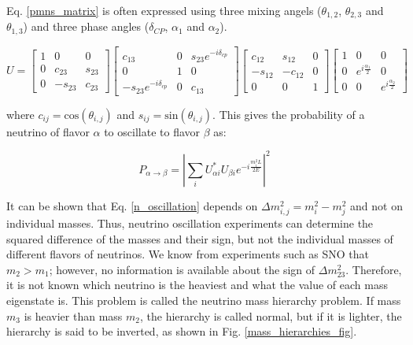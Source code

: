 Eq. \ref{pmns_matrix} is often expressed using three mixing angels ($\theta_{1,2}$, $\theta_{2,3}$ and $\theta_{1,3}$) and three phase angles ($\delta_{CP}$, $\alpha_1$ and $\alpha_2$).

\begin{equation}\label{pmns_matrix_expanded}
U = \begin{bmatrix} 1 & 0 & 0\\ 0 & c_{23} & s_{23} \\ 0 & -s_{23} & c_{23} \end{bmatrix} \begin{bmatrix} c_{13} & 0 & s_{23}e^{-i\delta_{cp}}\\ 0 & 1 & 0 \\ -s_{23}e^{-i\delta_{cp}} & 0 & c_{13} \end{bmatrix} \begin{bmatrix} c_{12} & s_{12} & 0\\ -s_{12} & -c_{12} & 0 \\ 0 & 0 & 1 \end{bmatrix} \begin{bmatrix} 1 & 0 & 0\\ 0 & e^{i\frac{\alpha_1}{2}} & 0 \\ 0 & 0 & e^{i\frac{\alpha_2}{2}}\end{bmatrix}
\end{equation}

where $c_{ij}=\mathrm{cos}(\theta_{i,j})$ and $s_{ij}=\mathrm{sin}(\theta_{i,j})$. This gives the probability of a neutrino of flavor $\alpha$ to oscillate to flavor $\beta$ as:

\begin{equation}\label{n_oscillation}
P_{\alpha\rightarrow\beta} = \left|\sum_i U^*_{\alpha i}U_{\beta i} e^{-i\frac{m_i^2L}{2E}}\right|^2
\end{equation}

It can be shown that Eq. \ref{n_oscillation} depends on $\Delta m^2_{i,j}=m^2_i-m^2_j$ and not on individual masses. Thus, neutrino oscillation experiments can determine the squared difference of the masses and their sign, but not the individual masses of different flavors of neutrinos. We know from experiments such as SNO that $m_2>m_1$; however, no information is available about the sign of $\Delta m_{23}^2$. Therefore, it is not known which neutrino is the heaviest and what the value of each mass eigenstate is. This problem is called the neutrino mass hierarchy problem. If mass $m_3$ is heavier than mass $m_2$, the hierarchy is called normal, but if it is lighter, the hierarchy is said to be inverted, as shown in Fig. \ref{mass_hierarchies_fig}.

